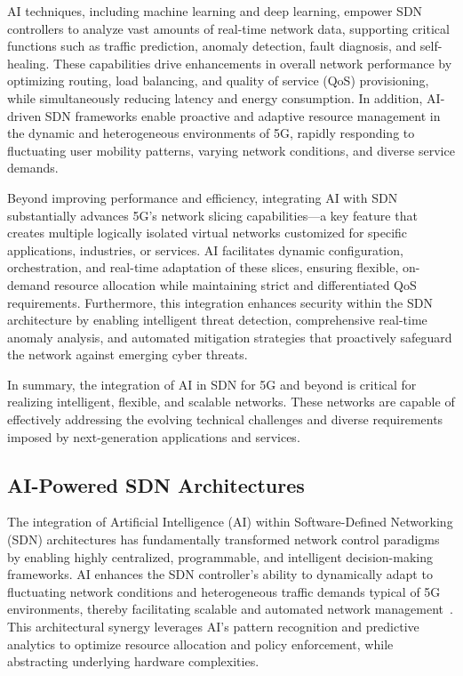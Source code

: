 \documentclass[sigconf]{acmart}
\begin{document}
AI techniques, including machine learning and deep learning, empower SDN controllers to analyze vast amounts of real-time network data, supporting critical functions such as traffic prediction, anomaly detection, fault diagnosis, and self-healing. These capabilities drive enhancements in overall network performance by optimizing routing, load balancing, and quality of service (QoS) provisioning, while simultaneously reducing latency and energy consumption. In addition, AI-driven SDN frameworks enable proactive and adaptive resource management in the dynamic and heterogeneous environments of 5G, rapidly responding to fluctuating user mobility patterns, varying network conditions, and diverse service demands.

Beyond improving performance and efficiency, integrating AI with SDN substantially advances 5G's network slicing capabilities—a key feature that creates multiple logically isolated virtual networks customized for specific applications, industries, or services. AI facilitates dynamic configuration, orchestration, and real-time adaptation of these slices, ensuring flexible, on-demand resource allocation while maintaining strict and differentiated QoS requirements. Furthermore, this integration enhances security within the SDN architecture by enabling intelligent threat detection, comprehensive real-time anomaly analysis, and automated mitigation strategies that proactively safeguard the network against emerging cyber threats.

In summary, the integration of AI in SDN for 5G and beyond is critical for realizing intelligent, flexible, and scalable networks. These networks are capable of effectively addressing the evolving technical challenges and diverse requirements imposed by next-generation applications and services.

\subsection{AI-Powered SDN Architectures}

The integration of Artificial Intelligence (AI) within Software-Defined Networking (SDN) architectures has fundamentally transformed network control paradigms by enabling highly centralized, programmable, and intelligent decision-making frameworks. AI enhances the SDN controller’s ability to dynamically adapt to fluctuating network conditions and heterogeneous traffic demands typical of 5G environments, thereby facilitating scalable and automated network management~\cite{ref52}. This architectural synergy leverages AI’s pattern recognition and predictive analytics to optimize resource allocation and policy enforcement, while abstracting underlying hardware complexities.
\end{document}
